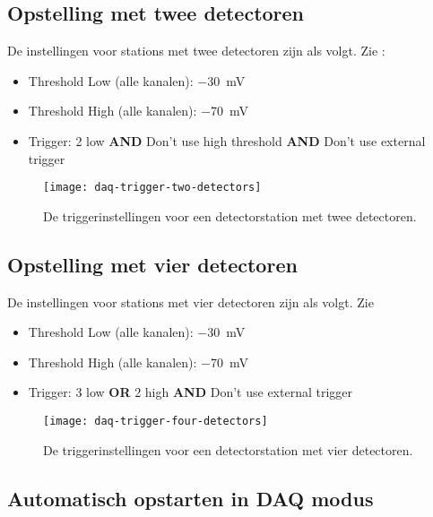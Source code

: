\subsection{Opstelling met twee detectoren}

De instellingen voor stations met twee detectoren zijn als volgt. Zie
:

\begin{itemize}
    \item Threshold Low (alle kanalen): \SI{-30}{\milli\volt}
    \item Threshold High (alle kanalen): \SI{-70}{\milli\volt}
    \item Trigger: 2 low \textbf{AND} Don’t use high threshold \textbf{AND}
          Don’t use external trigger
\end{itemize}

\begin{figure}
    \centering
    \texttt{[image: daq-trigger-two-detectors]}
    \caption{De triggerinstellingen voor een detectorstation met twee detectoren.}
    \label{fig:daq-trigger-two-detectors}
\end{figure}


\subsection{Opstelling met vier detectoren}

De instellingen voor stations met vier detectoren zijn als volgt. Zie

\begin{itemize}
    \item Threshold Low (alle kanalen): \SI{-30}{\milli\volt}
    \item Threshold High (alle kanalen): \SI{-70}{\milli\volt}
    \item Trigger: 3 low \textbf{OR} 2 high \textbf{AND} Don’t use external trigger
\end{itemize}   
 
\begin{figure}
    \centering
    \texttt{[image: daq-trigger-four-detectors]}
    \caption{De triggerinstellingen voor een detectorstation met vier detectoren.}
    \label{fig:daq-trigger-four-detectors}
\end{figure}


\subsection{Automatisch opstarten in DAQ modus}

